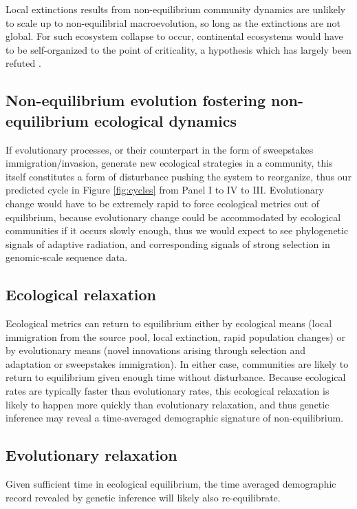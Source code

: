 \documentclass[12pt]{article}
\begin{document}
Local extinctions results from non-equilibrium community dynamics are
unlikely to scale up to non-equilibrial macroevolution, so long as the
extinctions are not global. For such ecosystem collapse to occur,
continental ecosystems would have to be self-organized to the point of
criticality, a hypothesis which has largely been refuted
\cite{Kirchner1998-uk}.

\subsection{Non-equilibrium evolution fostering non-equilibrium ecological dynamics}

If evolutionary processes, or their counterpart in the form of
sweepstakes immigration/invasion, generate new ecological strategies
in a community, this itself constitutes a form of disturbance pushing
the system to reorganize, thus our predicted cycle in Figure
\ref{fig:cycles} from Panel I to IV to III.  Evolutionary change would
have to be extremely rapid to force ecological metrics out of
equilibrium, because evolutionary change could be accommodated by
ecological communities if it occurs slowly enough, thus we would
expect to see phylogenetic signals of adaptive radiation, and
corresponding signals of strong selection in genomic-scale sequence
data.

\subsection{Ecological relaxation}

Ecological metrics can return to equilibrium either by ecological
means (local immigration from the source pool, local extinction, rapid
population changes) or by evolutionary means (novel innovations
arising through selection and adaptation or sweepstakes
immigration). In either case, communities are likely to return to
equilibrium given enough time without disturbance. Because ecological
rates are typically faster than evolutionary rates, this ecological
relaxation is likely to happen more quickly than evolutionary
relaxation, and thus genetic inference may reveal a time-averaged
demographic signature of non-equilibrium.

\subsection{Evolutionary relaxation}

Given sufficient time in ecological equilibrium, the time averaged
demographic record revealed by genetic inference will likely also
re-equilibrate.
\end{document}
